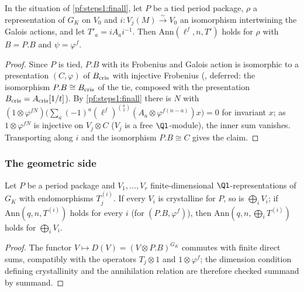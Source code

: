 \begin{corollary}\label{pf:steps1:annmodel}
In the situation of \cref{pf:steps1:finall}, let $P$ be a tied period package, $\rho$ a representation of $G_K$ on $V_0$ and
$i\colon V_j(M)\xrightarrow\sim V_0$ an isomorphism intertwining the Galois actions, and let $T'_a=iA_ai^{-1}$. Then
$\mathrm{Ann}(\ell^f,n,T')$ holds for $\rho$ with $B=P.B$ and $\psi=\varphi^f$.
\end{corollary}

\begin{proof}
Since $P$ is tied, $P.B$ with its Frobenius and Galois action is isomorphic to a presentation $(C,\varphi)$ of $B_{\mathrm{cris}}$
with injective Frobenius (, deferred: the isomorphism
$P.B\cong B_{\mathrm{cris}}$ of the tie, composed with the presentation $B_{\mathrm{cris}}=A_{\mathrm{cris}}[1/t]$). By
\cref{pf:steps1:finall} there is $N$ with $(1\otimes\varphi^{fN})\bigl(\sum_a(-1)^a(\ell^f)^{\binom a2}(A_a\otimes\varphi^{f(n-a)})x\bigr)
=0$ for invariant $x$; as $1\otimes\varphi^{fN}$ is injective on $V_j\otimes C$ ($V_j$ is a free $\Ql$-module), the inner sum
vanishes. Transporting along $i$ and the isomorphism $P.B\cong C$ gives the claim.
\end{proof}

\subsubsection{The geometric side}

\begin{lemma}\label{pf:steps1:annpi}
Let $P$ be a period package and $V_1,\dots,V_r$ finite-dimensional $\Ql$-representations of $G_{K}$ with endomorphisms
$T^{(i)}_j$. If every $V_i$ is crystalline for $P$, so is $\bigoplus_iV_i$; if $\mathrm{Ann}(q,n,T^{(i)})$ holds for every $i$
(for $(P.B,\varphi^f)$), then $\mathrm{Ann}(q,n,\bigoplus_iT^{(i)})$ holds for $\bigoplus_iV_i$.
\end{lemma}

\begin{proof}
The functor $V\mapsto D(V)=(V\otimes P.B)^{G_K}$ commutes with finite direct sums, compatibly with the operators $T_j\otimes1$ and
$1\otimes\varphi^f$; the dimension condition defining crystallinity and the annihilation relation are therefore checked summand by
summand.
\end{proof}

